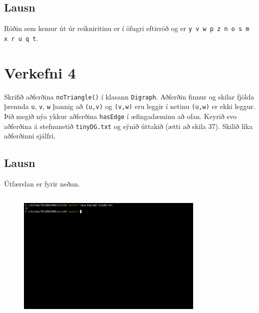 \documentclass[12pt, a4paper, hidelinks]{article}
\begin{document}
\subsection*{Lausn}
Röðin sem kemur út úr reikniritinu er í öfugri eftirröð og er \texttt{y v w p z n o s m x r u q t}.
\newpage
\section*{Verkefni 4}
Skrifið aðferðina \texttt{noTriangle()} í klasann \texttt{Digraph}. Aðferðin finnur og skilar fjölda þrennda \texttt{u}, \texttt{v}, \texttt{w} þannig að \texttt{(u,v)} og \texttt{(v,w)} eru leggir í netinu \texttt{(u,w)} er ekki leggur. Þið megið nýa ykkur aðferðina \texttt{hasEdge} í æfingadæminu að ofan. Keyrið svo aðferðina á stefnunetið \texttt{tinyDG.txt} og sýnið úttakið (ætti að skila 37). Skilið líka aðferðinni sjálfri.

\subsection*{Lausn}
Útfærslan er fyrir neðan.
\begin{listing}[H]
    \centering
    \inputminted[linenos, breaklines, firstline=207, lastline=218]{java}{../src/V4/Digraph.java}
\end{listing}
\begin{figure}[H]
    \centering
    \includegraphics[width=0.8\textwidth]{v4_keyrsla.png}
\end{figure}
\end{document}
